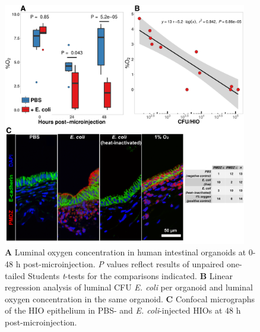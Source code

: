 \documentclass[9pt,lineo]{elife}
\begin{document}
\begin{figure}
\begin{fullwidth}
\centering
\includegraphics[width=0.95\textwidth]{./figures/figure4/figure4_multipanel.pdf}
\caption{\textbf{A} Luminal oxygen concentration in human intestinal organoids at 0-48 h post-microinjection. \textit{P} values reflect results of unpaired one-tailed Students \textit{t}-tests for the comparisons indicated. \textbf{B} Linear regression analysis of luminal CFU \textit{E. coli} per organoid and luminal oxygen concentration in the same organoid. \textbf{C} Confocal micrographs of the HIO epithelium in PBS- and \textit{E. coli}-injected HIOs at 48 h post-microinjection.}
\label{fig:fullwidth}
\end{fullwidth}
\end{figure}
\end{document}
